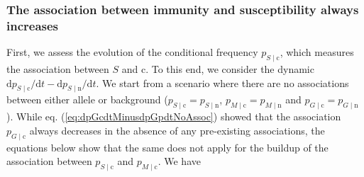 \documentclass{article}
\newcommand{\badFGE}{M}
\newcommand{\goodFGE}{G}
\newcommand{\sensitive}{\mathrm{n}}
\newcommand{\immune}{\mathrm{c}}
\begin{document}
\subsubsection{The association between immunity and susceptibility always increases}
First, we assess the evolution of the conditional frequency $p_{S\mid \immune}$, which measures the association between $S$ and $\immune$. To this end, we consider the dynamic $\mathrm{d} p_{S\mid \immune}/ \mathrm{d} t - \mathrm{d} p_{S\mid \sensitive}/ \mathrm{d} t$. We start from a scenario where there are no associations between either allele or background  ($p_{S \mid \immune} = p_{S \mid \sensitive}$, $p_{\badFGE \mid \immune} = p_{\badFGE \mid \sensitive}$ and $p_{\goodFGE \mid \immune} = p_{\goodFGE \mid \sensitive}$). While eq. (\ref{eq:dpGcdtMinusdpGpdtNoAssoc}) showed that the association $p_{\goodFGE \mid \immune}$ always decreases in the absence of any pre-existing associations, the equations below show that the same does not apply for the buildup of the association between $p_{S \mid \immune}$ and $p_{\badFGE \mid \immune}$.
We have
\end{document}
